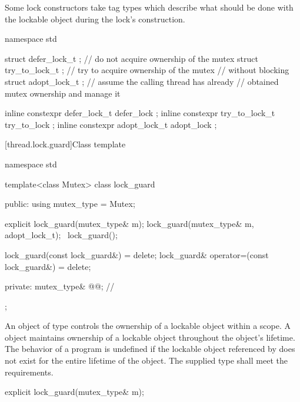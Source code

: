 \pnum
Some lock constructors take tag types which describe what should be done with the lockable
object during the lock's construction.

%
%
%
%
%
%
\begin{codeblock}
namespace std {
  struct defer_lock_t  { };     // do not acquire ownership of the mutex
  struct try_to_lock_t { };     // try to acquire ownership of the mutex
                                // without blocking
  struct adopt_lock_t  { };     // assume the calling thread has already
                                // obtained mutex ownership and manage it

  inline constexpr defer_lock_t  defer_lock { };
  inline constexpr try_to_lock_t try_to_lock { };
  inline constexpr adopt_lock_t  adopt_lock { };
}
\end{codeblock}

[thread.lock.guard]{Class template }

%
\begin{codeblock}
namespace std {
  template<class Mutex>
  class lock_guard {
  public:
    using mutex_type = Mutex;

    explicit lock_guard(mutex_type& m);
    lock_guard(mutex_type& m, adopt_lock_t);
    ~lock_guard();

    lock_guard(const lock_guard&) = delete;
    lock_guard& operator=(const lock_guard&) = delete;

  private:
    mutex_type& @@;             // \expos
  };
}
\end{codeblock}

\pnum
An object of type  controls the ownership of a lockable object
within a scope. A  object maintains ownership of a lockable
object throughout the  object's lifetime.
The behavior of a program is undefined if the lockable object referenced by
 does not exist for the entire lifetime of the 
object. The supplied  type shall meet the 
requirements.

%
\begin{itemdecl}
explicit lock_guard(mutex_type& m);
\end{itemdecl}

